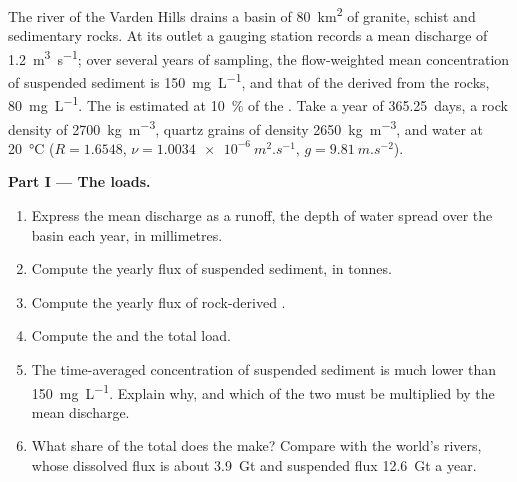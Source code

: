 \begin{problem}
\label{pb:b1:erosion-transport:1}
The river of the Varden Hills drains a basin of \qty{80}{km^2} of granite,
schist and sedimentary rocks. At its outlet a gauging station records a mean
discharge of \qty{1.2}{m^3.s^{-1}}; over several years of sampling, the
flow-weighted mean concentration of suspended sediment is \qty{150}{mg.L^{-1}},
and that of the  derived from the rocks, \qty{80}{mg.L^{-1}}.
The  is estimated at \qty{10}{\percent} of the . Take a
year of \num{365.25}~days, a rock density of \qty{2700}{kg.m^{-3}}, quartz
grains of density \qty{2650}{kg.m^{-3}}, and water at \qty{20}{\celsius} ($R
= 1.6548$, $\nu = \qty{1.0034e-6}{m^2.s^{-1}}$, $g = \qty{9.81}{m.s^{-2}}$).

\medskip
\noindent\textbf{Part I --- The loads.}
\begin{enumerate}
  \item Express the mean discharge as a runoff, the depth of water spread
        over the basin each year, in millimetres.
  \item Compute the yearly flux of suspended sediment, in tonnes.
  \item Compute the yearly flux of rock-derived .
  \item Compute the  and the total load.
  \item The time-averaged concentration of suspended sediment is much lower
        than \qty{150}{mg.L^{-1}}. Explain why, and which of the two must be
        multiplied by the mean discharge.
  \item What share of the total does the  make? Compare with
        the world's rivers, whose dissolved flux is about
        \qty{3.9}{Gt} and suspended flux \qty{12.6}{Gt} a year.
\end{enumerate}


\end{problem}
